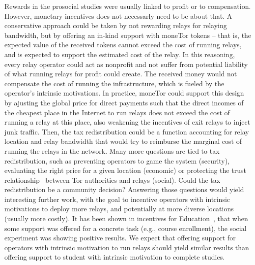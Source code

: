 Rewards in the prosocial studies were usually linked to profit or to compensation. However, monetary 
incentives does not necessarly need to be about that. A 
conservative approach could be taken by not rewarding relays for relaying 
bandwidth, but by offering an
in-kind support with moneTor tokens -- that is, the expected value of the received tokens cannot exceed the cost of 
running relays, and is expected to support the estimated 
cost of the relay. In this reasoning, every relay operator could act as nonprofit and not 
suffer from potential liability of what running relays for profit could create. The received 
money would not compensate the 
cost of running the infrastructure, which is fueled by the operator's intrinsic 
motivations.  In practice, moneTor could support this design by ajusting the 
global price for direct payments such that the direct incomes of the 
cheapest place in the Internet to run relays does not exceed the cost of running 
a relay at this place, also weakening the incentives of exit relays to inject junk traffic. Then, the tax redistribution could be a function 
accounting for relay location and relay bandwidth that would try to reimburse 
the marginal cost of running the relays in the network. Many more questions are 
tied to tax redistribution, such as preventing operators to game the system 
(security), evaluating the right price for a given location (economic) or 
protecting the trust relationship~\cite{10.1257/aer.96.5.1611} between Tor authorities and 
relays (social). Could the tax redistribution be a community decision? 
Answering those questions would yield interesting further work, with the goal to incentive 
operators with intrinsic motivations to deploy 
more relays, and potentially at more diverse locations (usually more costly). It has been 
shown in incentives for Education~\cite{10.1257/jep.25.4.191, 10.1086/431263}, that when 
some support was offered for a concrete task (e.g., course enrollment), the social 
experiment was showing positive results. We expect that offering support for operators with 
intrinsic motivation to run relays should yield similar results than offering support to 
student with intrinsic motivation to complete studies.

